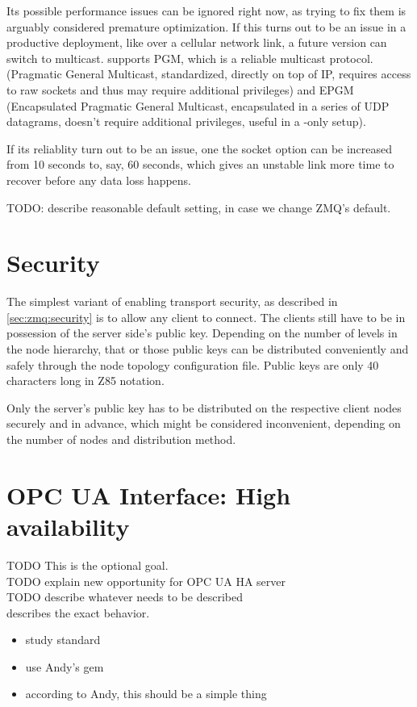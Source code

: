 Its possible performance issues can be ignored right now, as trying to fix them
is arguably considered premature optimization. If this turns out to be an issue
in a productive deployment, like over a cellular network link, a future version
can switch to multicast. \zmq supports PGM, which is a reliable multicast
protocol. (Pragmatic General Multicast, standardized, directly on top of IP,
requires access to raw sockets and thus may require additional privileges) and
EPGM (Encapsulated Pragmatic General Multicast, encapsulated in a series of UDP
datagrams, doesn't require additional privileges, useful in a \zmq-only setup).

If its reliablity turn out to be an issue, one the socket option
 can be increased from 10 seconds to, say, 60 seconds, which
gives an unstable link more time to recover before any data loss happens.

TODO: describe reasonable default setting, in case we change ZMQ's default.


\section{Security}\label{sec:approach:security}
The simplest variant of enabling transport security, as described in
\autoref{sec:zmq:security} is to allow any client to connect. The clients still
have to be in possession of the server side's public key. Depending on the
number of levels in the node hierarchy, that or those public keys can be
distributed conveniently and safely through the node topology configuration
file. Public keys are only 40 characters long in \gls{Z85} notation.

Only the server's public key has to be distributed on the respective client nodes
securely and in advance, which might be considered inconvenient, depending on
the number of nodes and distribution method.

\section{OPC UA Interface: High availability}\label{sec:approach:opc-ua}
TODO This is the optional goal.\\
TODO explain new opportunity for OPC UA HA server\\
TODO describe whatever needs to be described\\


\cite[6.4.2.4 Non-transparent Redundancy, p.~96]{opc-ua:behavior:server-redundancy} describes the exact behavior.

\begin{itemize}
	\item study standard
	\item use Andy's gem
	\item according to Andy, this should be a simple thing
\end{itemize}
